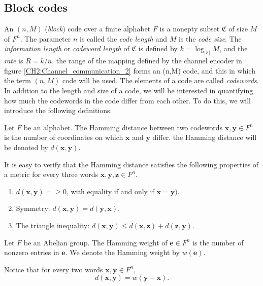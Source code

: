 \subsection{Block codes}
An $(n,M)$ (\textit{block}) code over a finite alphabet $F$ is a nonepty subset $\mathfrak{C}$ of size $M$ of $F^n$. The parameter $n$ is called the \textit{code length} and $M$ is the \textit{code size}. The \textit{information length} or \textit{codeword length} of $\mathfrak{C}$ is defined by $k=\log_{|F|}M$, and the \textit{rate} is $R=k/n$. the range of the mapping defined by the channel encoder in figure \ref{CH2:Channel_communication_2} forms an (n,M) code, and this in which the term $(n,M)$ code will be used. The elements of a code are called \textit{codewords}.\\
\indent In addition to the length and size of a code, we will be interested in quantifying how much the codewords in the code differ from each other. To do this, we will introduce the following definitions.
\begin{definition}
Let $F$ be an alphabet. The Hamming distance between two codewords $\mathbf{x},\mathbf{y}\in F^n$ is the number of coordinates on which $\mathbf{x}$ and $\mathbf{y}$ differ. the Hamming distance will be denoted by $d(\mathbf{x},\mathbf{y})$.
\end{definition}
\indent It is easy to verify that the Hamming distance satisfies the following properties of a metric for every three words $\mathbf{x},\mathbf{y},\mathbf{z}\in F^n$.
\begin{enumerate}[label=(\roman*)]
\item $d(\mathbf{x},\mathbf{y})=\geq 0$, with equality if and only if $\mathbf{x}=\mathbf{y})$.
\item Symmetry: $d(\mathbf{x},\mathbf{y})=d(\mathbf{y},\mathbf{x})$.
\item The triangle inequality: $d(\mathbf{x},\mathbf{y}) \leq d(\mathbf{x},\mathbf{z})+ d(\mathbf{z},\mathbf{y})$.
\end{enumerate}
\begin{definition}
Let $F$ be an Abelian group. The Hamming weight of $\mathbf{e}\in F^n$ is the number of nonzero entries in $\mathbf{e}$. We denote the Hamming weight by $w(\mathbf{e})$.
\end{definition}
\indent Notice that for every two words $\mathbf{x}, \mathbf{y}\in F^n$,
\begin{equation}
d(\mathbf{x},\mathbf{y}) = w(\mathbf{y}-\mathbf{x}).
\end{equation}
